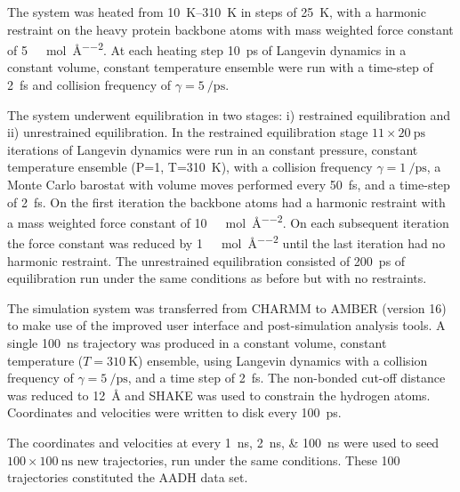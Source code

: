 The system was heated from \SIrange{10}{310}{\kelvin} in steps of \SI{25}{\kelvin}, with a harmonic restraint on the heavy protein backbone atoms with mass weighted force constant of \SI{5}{\kilo\cal\per\mol\per\square\angstrom}. At each heating step \SI{10}{\pico\second} of Langevin dynamics \cite{ermakComputerSimulationCharged1974,ermakEquilibriumElectrostaticEffects1974} in a constant volume, constant temperature ensemble were run with a time-step of \SI{2}{\femto\second} and collision frequency of $\gamma=\SI{5}{\per\pico\second}$. 

The system underwent equilibration in two stages: i) restrained equilibration and ii) unrestrained equilibration. In the restrained equilibration stage $11 \times \SI{20}{\pico\second}$ iterations of Langevin dynamics were run in an constant pressure, constant temperature ensemble (P=\SI{1}{\atm}, T=\SI{310}{\kelvin}), with a collision frequency $\gamma=\SI{1}{\per\pico\second}$, a Monte Carlo barostat with volume moves performed every \SI{50}{\femto\second}, and a time-step of \SI{2}{\femto\second}. On the first iteration the backbone atoms had a harmonic restraint with a mass weighted force constant of  \SI{10}{\kilo\cal\per\mol\per\square\angstrom}. On each subsequent iteration the force constant was reduced by \SI{1}{\kilo\cal\per\mol\per\square\angstrom} until the last iteration had no harmonic restraint. The unrestrained equilibration consisted of \SI{200}{\pico\second} of equilibration run under the same conditions as before but with no restraints. 

The simulation system was transferred from CHARMM to AMBER (version 16) \cite{caseAMBER} to make use of the improved user interface and post-simulation analysis tools. A single  \SI{100}{\nano\second} trajectory was produced in a constant volume, constant temperature ($T=\SI{310}{\kelvin}$) ensemble, using Langevin dynamics with a collision frequency of $\gamma=\SI{5}{\per\pico\second}$, and a time step of \SI{2}{\femto\second}. The non-bonded cut-off distance was reduced to \SI{12}{\angstrom} and SHAKE \cite{ryckaertNumericalIntegrationCartesian1977b} was used to constrain the hydrogen atoms. Coordinates and velocities were written to disk every \SI{100}{\pico\second}.  

The coordinates and velocities at every \SIlist[list-final-separator = { ... }]{1; 2; 100}{\nano\second} were used to seed $100 \times \SI{100}{\nano\second}$ new trajectories, run under the same conditions. These \num{100} trajectories constituted the AADH data set. 

